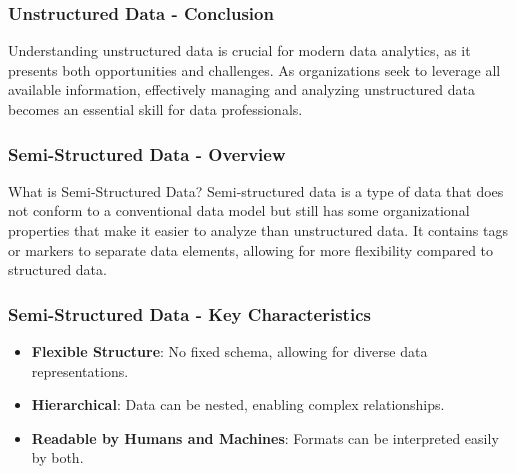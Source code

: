 \documentclass{beamer}
\begin{document}
\begin{frame}[fragile]
    \frametitle{Unstructured Data - Conclusion}
    Understanding unstructured data is crucial for modern data analytics, as it presents both opportunities and challenges. As organizations seek to leverage all available information, effectively managing and analyzing unstructured data becomes an essential skill for data professionals.
\end{frame}

\begin{frame}[fragile]
    \frametitle{Semi-Structured Data - Overview}
    \begin{block}{What is Semi-Structured Data?}
        Semi-structured data is a type of data that does not conform to a conventional data model but still has some organizational properties that make it easier to analyze than unstructured data. It contains tags or markers to separate data elements, allowing for more flexibility compared to structured data.
    \end{block}
\end{frame}

\begin{frame}[fragile]
    \frametitle{Semi-Structured Data - Key Characteristics}
    \begin{itemize}
        \item \textbf{Flexible Structure}: No fixed schema, allowing for diverse data representations.
        \item \textbf{Hierarchical}: Data can be nested, enabling complex relationships.
        \item \textbf{Readable by Humans and Machines}: Formats can be interpreted easily by both.
    \end{itemize}
\end{frame}
\end{document}
